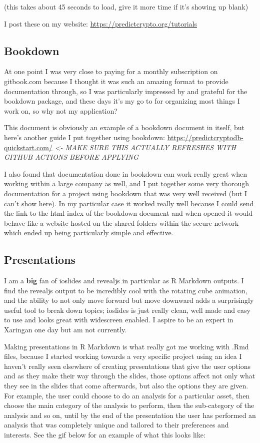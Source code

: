 \documentclass[
]{book}
\begin{document}
(this takes about 45 seconds to load, give it more time if it's showing up blank)

I post these on my website: \url{https://predictcrypto.org/tutorials}

\hypertarget{bookdown}{%
\subsection{Bookdown}\label{bookdown}}

At one point I was very close to paying for a monthly subscription on gitbook.com because I thought it was such an amazing format to provide documentation through, so I was particularly impressed by and grateful for the bookdown \citep{R-bookdown} package, and these days it's my go to for organizing most things I work on, so why not my application?

This document is obviously an example of a bookdown document in itself, but here's another guide I put together using bookdown: \url{https://predictcryptodb-quickstart.com/} \emph{\textless- MAKE SURE THIS ACTUALLY REFRESHES WITH GITHUB ACTIONS BEFORE APPLYING}

I also found that documentation done in bookdown can work really great when working within a large company as well, and I put together some very thorough documentation for a project using bookdown that was very well received (but I can't show here). In my particular case it worked really well because I could send the link to the html index of the bookdown document and when opened it would behave like a website hosted on the shared folders within the secure network which ended up being particularly simple and effective.

\hypertarget{presentations}{%
\subsection{Presentations}\label{presentations}}

I am a \textbf{big} fan of ioslides and revealjs in particular as R Markdown outputs. I find the revealjs output to be incredibly cool with the rotating cube animation, and the ability to not only move forward but move downward adds a surprisingly useful tool to break down topics; ioslides is just really clean, well made and easy to use and looks great with widescreen enabled. I aspire to be an expert in Xaringan one day but am not currently.

Making presentations in R Markdown is what really got me working with .Rmd files, because I started working towards a very specific project using an idea I haven't really seen elsewhere of creating presentations that give the user options and as they make their way through the slides, those options affect not only what they see in the slides that come afterwards, but also the options they are given. For example, the user could choose to do an analysis for a particular asset, then choose the main category of the analysis to perform, then the sub-category of the analysis and so on, until by the end of the presentation the user has performed an analysis that was completely unique and tailored to their preferences and interests. See the gif below for an example of what this looks like:
\end{document}
